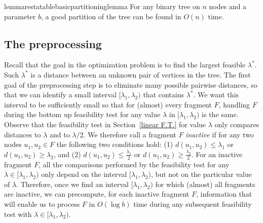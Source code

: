 \documentclass[a4paper,UKenglish]{lipics-v2016}
\theoremstyle{plain}
\begin{document}
\begin{restatable}{lemmarestatable}{basicpartitioninglemma}
\label{basic partitioning lemma}
For any binary tree on $n$ nodes and a parameter $b$, a good partition of the tree can be found in $O(n)$ time.
\end{restatable}


\subsection{The preprocessing} \label{Pre-Processing Fragments}

Recall that the goal in the optimization problem is to find the largest feasible $\lambda^{*}$. Such $\lambda^{*}$
is a distance between an unknown pair of vertices in the tree. The first goal of the preprocessing step is to eliminate many possible pairwise distances, so that we can identify a small interval $[\lambda_1,\lambda_2)$ that contains $\lambda^*$. We want this interval to be sufficiently small so that for (almost) every fragment $F$, handling $F$ during the bottom up feasibility test for any value $\lambda$ in $[\lambda_1,\lambda_2)$ is the same. Observe that the feasibility test in Section~\ref{linear F.T.} for value $\lambda$ only compares distances to $\lambda$ and to $\lambda/2$. We therefore call a fragment $F$ \emph{inactive} if for any two nodes $u_1,u_2\in F$ the following two conditions hold: (1) $d(u_{1},u_{2})\leq \lambda_{1}$ or $d(u_{1},u_{2})\geq\lambda_{2}$, and (2) $d(u_{1},u_{2})\leq \frac{\lambda_{1}}{2}$ or $d(u_{1},u_{2})\geq \frac{\lambda_{2}}{2}$. For an inactive fragment $F$, all the comparisons performed by the feasibility test for any $\lambda \in [\lambda_1,\lambda_2)$ only depend on the interval $[\lambda_1,\lambda_2)$, but not on the particular value of $\lambda$. Therefore, once we find an interval $[\lambda_1,\lambda_2)$ for which (almost) all fragments are inactive, we can precompute, for each inactive fragment $F$, information that will enable us to process $F$ in $O(\log b)$ time during any subsequent feasibility test with $\lambda \in [\lambda_1,\lambda_2)$.
\end{document}

